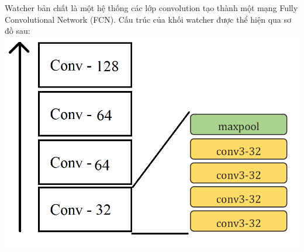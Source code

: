 \documentclass{beamer}
\begin{document}
\begin{frame}
	Watcher bản chất là một hệ thống các lớp convolution tạo thành một mạng Fully Convolutional Network (FCN). Cấu trúc của khối watcher được thể hiện qua sơ đồ sau:\\
	\includegraphics[width=0.9\linewidth]{FCN_Summary.png}
\end{frame}
\end{document}
